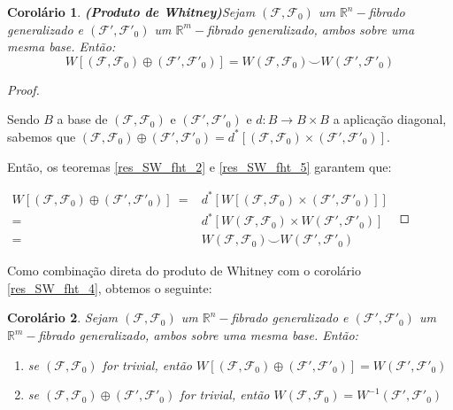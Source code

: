 \documentclass[12pt,oneside]{book} %
\newtheorem{cor}    {\hspace{0.5cm}Corol\'ario}[chapter]
\newcommand{\R}{\mathbb{R}}
\newcommand{\ccup}{\smile}
\begin{document}
\begin{cor}{\bf (Produto de Whitney)}\label{res_SW_fht_6}
	Sejam $(\mathcal{F},\mathcal{F}_{0})$ um $\R^{n}-$fibrado generalizado e $(\mathcal{F'},\mathcal{F'}_{0})$ um $\R^{m}-$fibrado generalizado, ambos sobre uma mesma base. Então:
	$$ W[(\mathcal{F},\mathcal{F}_{0})\oplus (\mathcal{F'},\mathcal{F'}_{0})]=W(\mathcal{F},\mathcal{F}_{0})\ccup W(\mathcal{F'},\mathcal{F'}_{0}) $$
\end{cor}
\begin{proof}
	
	\
	
	\par Sendo $B$ a base de $(\mathcal{F},\mathcal{F}_{0})$ e $(\mathcal{F'},\mathcal{F'}_{0})$ e $d:B\to B\times B$ a aplicação diagonal, sabemos que $(\mathcal{F},\mathcal{F}_{0})\oplus (\mathcal{F'},\mathcal{F'}_{0})=d^{*}[(\mathcal{F},\mathcal{F}_{0})\times (\mathcal{F'},\mathcal{F'}_{0})]$.
	
	\par Então, os teoremas \ref{res_SW_fht_2} e \ref{res_SW_fht_5} garantem que: \newline
	
	$\begin{array}{rl}
		W[(\mathcal{F},\mathcal{F}_{0})\oplus (\mathcal{F'},\mathcal{F'}_{0})] \ = & d^{*}[W[(\mathcal{F},\mathcal{F}_{0})\times (\mathcal{F'},\mathcal{F'}_{0})]] \\
		= & d^{*}[W(\mathcal{F},\mathcal{F}_{0})\times W(\mathcal{F'},\mathcal{F'}_{0})] \\
		= & W(\mathcal{F},\mathcal{F}_{0})\ccup W(\mathcal{F'},\mathcal{F'}_{0})
	\end{array}$
	
\end{proof}

\par Como combinação direta do produto de Whitney com o corolário \ref{res_SW_fht_4}, obtemos o seguinte:

\begin{cor}\label{res_SW_fht_7}
	Sejam $(\mathcal{F},\mathcal{F}_{0})$ um $\R^{n}-$fibrado generalizado e $(\mathcal{F'},\mathcal{F'}_{0})$ um $\R^{m}-$fibrado generalizado, ambos sobre uma mesma base. Então:
	
	\begin{enumerate}
		\item se $(\mathcal{F},\mathcal{F}_{0})$ for trivial, então $W[(\mathcal{F},\mathcal{F}_{0})\oplus (\mathcal{F'},\mathcal{F'}_{0})]=W(\mathcal{F'},\mathcal{F'}_{0})$
		\item se $(\mathcal{F},\mathcal{F}_{0})\oplus (\mathcal{F'},\mathcal{F'}_{0})$ for trivial, então $W(\mathcal{F},\mathcal{F}_{0})=W^{-1}(\mathcal{F'},\mathcal{F'}_{0})$
	\end{enumerate}
\end{cor}
\end{document}
